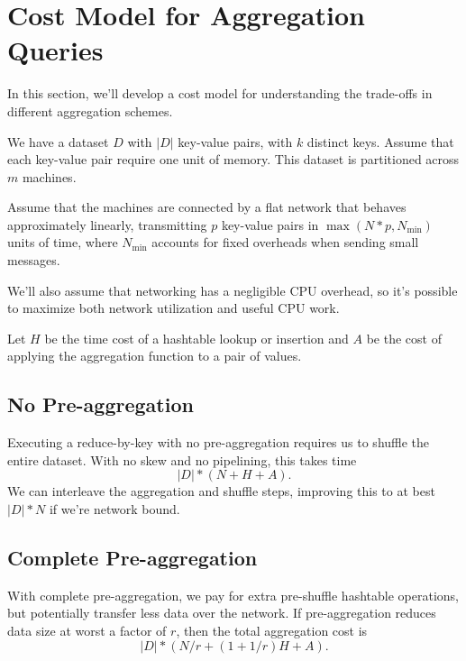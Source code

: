 \documentclass[12pt]{article}
\begin{document}




\section{Cost Model for Aggregation Queries}

In this section, we'll develop a cost model for understanding the trade-offs
in different aggregation schemes.

We have a dataset $D$ with $|D|$ key-value pairs, with $k$ distinct keys.
Assume that each key-value pair require one unit of memory.
This dataset is partitioned across $m$ machines.

Assume that the machines are connected by a flat network that behaves
approximately linearly, transmitting $p$ key-value pairs in $\max(N * p,
N_{\min})$ units of time, where $N_{\min}$ accounts for fixed overheads when
sending small messages.

We'll also assume that networking has a negligible CPU overhead, so it's
possible to maximize both network utilization and useful CPU work.

Let $H$ be the time cost of a hashtable lookup or insertion and $A$ be the
cost of applying the aggregation function to a pair of values.

\subsection{No Pre-aggregation}

Executing a reduce-by-key with no pre-aggregation requires us to shuffle the
entire dataset.  With no skew and no pipelining, this takes time 
\[
    |D| * (N + H + A).
\]
We can interleave the aggregation and shuffle steps, improving
this to at best $|D| * N$ if we're network bound.

\subsection{Complete Pre-aggregation}

With complete pre-aggregation, we pay for extra pre-shuffle hashtable
operations, but potentially transfer less data over the network.  If
pre-aggregation reduces data size at worst a factor of $r$, then
the total aggregation cost is
\[
    |D| * (N/r + (1 + 1/r)H + A).
\]
\end{document}
